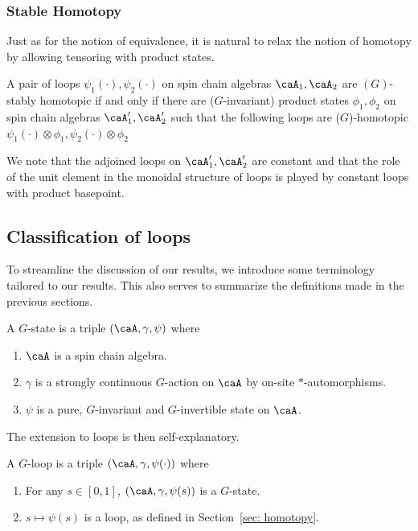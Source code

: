 \subsubsection{Stable Homotopy} \label{sec: stable homotopy}

Just as for the notion of equivalence, it is natural to relax the notion of homotopy by allowing tensoring with product states. 

\begin{definition}
	A pair of loops $\psi_1(\cdot),\psi_2(\cdot)$ on spin chain algebras $\caA_1,\caA_2$ are $(G)$-stably homotopic if and only if there are  ($G$-invariant) product states $\phi_1,\phi_2$ on spin chain algebras $\caA'_1,\caA'_2$ such that the following loops are ($G$)-homotopic 
	$\psi_1(\cdot)\otimes \phi_1, \psi_2(\cdot)\otimes \phi_2$
\end{definition} 

We note that the adjoined loops on $\caA'_1,\caA'_2$ are constant and that the role of the unit element in the monoidal structure of loops is played  by constant loops with product basepoint.







\subsection{Classification of loops}\label{sec: classification of loops}

To streamline the discussion of our results, we introduce some terminology tailored to our results.   This also serves to summarize the definitions made in the previous sections. 
\begin{definition}[$G$-state]
	A $G$-state is a triple $(\caA,\gamma,\psi)$ where
	\begin{enumerate}
		\item $\caA$ is a spin chain algebra.
		\item $\gamma$ is a strongly continuous $G$-action on $\caA$ by on-site $*$-automorphisms. 
		\item $\psi$ is a pure, $G$-invariant and $G$-invertible state on $\caA$. 
	\end{enumerate}
\end{definition}
The extension to loops is then self-explanatory. 
\begin{definition}[$G$-loop]
	A $G$-loop is a triple $(\caA,\gamma,\psi(\cdot))$ where
	\begin{enumerate}
		\item For any $s\in [0,1]$, $(\caA,\gamma,\psi(s))$ is a $G$-state. 
		\item $s\mapsto \psi(s)$ is a loop, as defined in Section~\ref{sec: homotopy}.  
	\end{enumerate}
\end{definition}

